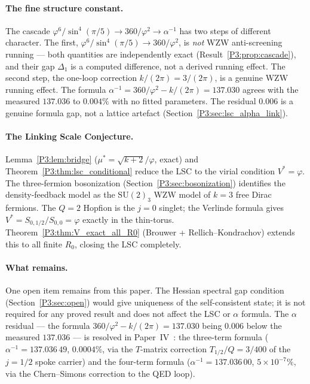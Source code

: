 \documentclass[11pt,a4paper]{article}
\theoremstyle{definition}
\theoremstyle{remark}
\newcommand{\vp}{\varphi}
\newcommand{\aInv}{\alpha^{-1}}
\begin{document}
\paragraph{The fine structure constant.}
The cascade $\vp^6/\sin^4(\pi/5) \to 360/\vp^2 \to \aInv$ has two steps
of different character. The first, $\vp^6/\sin^4(\pi/5)\to360/\vp^2$, is
\emph{not} WZW anti-screening running --- both quantities are
independently exact (Result~\ref{P3:prop:cascade}), and their gap
$\Delta_1$ is a computed difference, not a derived running effect.
The second step, the one-loop correction
$k/(2\pi)=3/(2\pi)$, is a genuine WZW running effect.
The formula $\aInv = 360/\vp^2 - k/(2\pi) = 137.030$ agrees with the
measured $137.036$ to $0.004\%$ with no fitted parameters.
The residual $0.006$ is a genuine formula gap, not a lattice artefact
(Section~\ref{P3:sec:lsc_alpha_link}).

\paragraph{The Linking Scale Conjecture.}
Lemma~\ref{P3:lem:bridge} ($\mu^* = \sqrt{k+2}/\vp$, exact) and
Theorem~\ref{P3:thm:lsc_conditional} reduce the LSC to the virial condition
$V^*=\vp$.  The three-fermion bosonization (Section~\ref{P3:sec:bosonization})
identifies the density-feedback model as the $\mathrm{SU}(2)_3$ WZW model
of $k=3$ free Dirac fermions.  The $Q=2$ Hopfion is the $j=0$ singlet;
the Verlinde formula gives $V^* = S_{0,1/2}/S_{0,0} = \vp$ exactly in the
thin-torus.  Theorem~\ref{P3:thm:V_exact_all_R0} (Brouwer + Rellich--Kondrachov)
extends this to all finite $R_0$, closing the LSC completely.

\paragraph{What remains.}
One open item remains from this paper.
The Hessian spectral gap condition (Section~\ref{P3:sec:open}) would
give uniqueness of the self-consistent state; it is not required for any
proved result and does not affect the LSC or $\alpha$ formula.
The $\alpha$ residual --- the formula $360/\vp^2 - k/(2\pi)
= 137.030$ being $0.006$ below the measured $137.036$ --- is resolved
in Paper~IV~\cite{Paper4}: the three-term formula
($\aInv = 137.036\,49$, $0.0004\%$, via the $T$-matrix correction
$T_{1/2}/Q = 3/400$ of the $j=1/2$ spoke carrier)
and the four-term formula ($\aInv = 137.036\,00$, $5\times10^{-7}\%$,
via the Chern--Simons correction to the QED loop).
\end{document}
